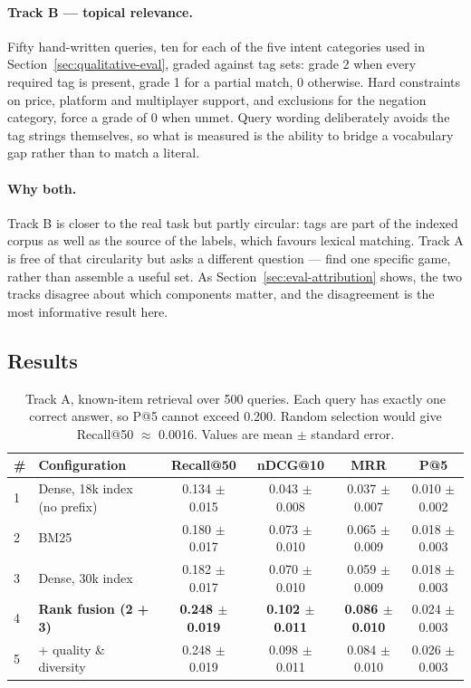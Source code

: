 \paragraph{Track B --- topical relevance.}
Fifty hand-written queries, ten for each of the five intent categories used in
Section~\ref{sec:qualitative-eval}, graded against tag sets: grade 2 when every
required tag is present, grade 1 for a partial match, 0 otherwise. Hard
constraints on price, platform and multiplayer support, and exclusions for the
negation category, force a grade of 0 when unmet. Query wording deliberately
avoids the tag strings themselves, so what is measured is the ability to bridge
a vocabulary gap rather than to match a literal.

\paragraph{Why both.}
Track B is closer to the real task but partly circular: tags are part of the
indexed corpus as well as the source of the labels, which favours lexical
matching. Track A is free of that circularity but asks a different question ---
find one specific game, rather than assemble a useful set. As
Section~\ref{sec:eval-attribution} shows, the two tracks disagree about which
components matter, and the disagreement is the most informative result here.

\subsection{Results}
\label{sec:eval-results}

\begin{table}[h]
\centering
\caption{Track A, known-item retrieval over 500 queries. Each query has exactly
one correct answer, so P@5 cannot exceed 0.200. Random selection would give
Recall@50 $\approx$ 0.0016. Values are mean $\pm$ standard error.}
\label{tab:track-a}
\small
\begin{tabular}{llcccc}
\hline
\textbf{\#} & \textbf{Configuration} & \textbf{Recall@50} & \textbf{nDCG@10} & \textbf{MRR} & \textbf{P@5} \\
\hline
1 & Dense, 18k index (no prefix) & 0.134 $\pm$ 0.015 & 0.043 $\pm$ 0.008 & 0.037 $\pm$ 0.007 & 0.010 $\pm$ 0.002 \\
2 & BM25                         & 0.180 $\pm$ 0.017 & 0.073 $\pm$ 0.010 & 0.065 $\pm$ 0.009 & 0.018 $\pm$ 0.003 \\
3 & Dense, 30k index             & 0.182 $\pm$ 0.017 & 0.070 $\pm$ 0.010 & 0.059 $\pm$ 0.009 & 0.018 $\pm$ 0.003 \\
4 & \textbf{Rank fusion (2 + 3)} & \textbf{0.248 $\pm$ 0.019} & \textbf{0.102 $\pm$ 0.011} & \textbf{0.086 $\pm$ 0.010} & 0.024 $\pm$ 0.003 \\
5 & \quad + quality \& diversity & 0.248 $\pm$ 0.019 & 0.098 $\pm$ 0.011 & 0.084 $\pm$ 0.010 & 0.026 $\pm$ 0.003 \\
\hline
\end{tabular}
\end{table}

